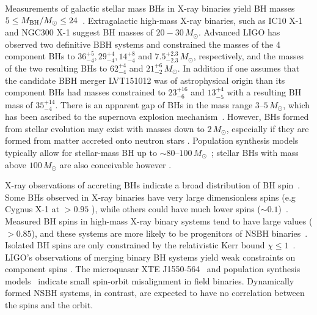 \documentclass[twocolumn]{aastex6}
\begin{document}
Measurements of galactic stellar mass
\acp{BH} in X-ray binaries yield \ac{BH} masses
$5 \le M_{\rm BH}/{M_{\odot}}\le 24$~\citep{Farr:2010tu,Ozel:2010su,Merloni:2008tj,Wiktorowicz:2013dua}.
Extragalactic high-mass X-ray binaries, such as IC10 X-1 and NGC300 X-1 suggest
BH masses of $20-30\,{M_{\odot}}$. Advanced \ac{LIGO} has observed two definitive \ac{BBH} systems and
constrained the masses of the 4 component \acp{BH} to $36_{-4}^{+5},
29_{-4}^{+4}, 14_{-4}^{+8}$ and $7.5_{-2.3}^{+2.3}\,M_{\odot}$, respectively, and
the masses of the two resulting \acp{BH} to $62_{-4}^{+4}$ and
$21_{-2}^{+6}\,M_{\odot}$. In addition if one assumes that the candidate \ac{BBH} merger LVT151012
was of astrophysical origin than its component \acp{BH} had masses constrained to $23_{-6}^{+16}$
and $13_{-5}^{+4}$ with a resulting \ac{BH} mass of $35_{-4}^{+14}$.
There is an apparent gap of \acp{BH} in the mass range $3$--$5\,
{M_{\odot}}$, which has been ascribed to the supernova explosion
mechanism~\citep{Belczynski:2011bn,Fryer:2011cx}. However, \acp{BH} formed from stellar
evolution may exist with masses down to $2\,{M_{\odot}}$, especially if they are formed
from matter accreted onto neutron stars \citep{O'Shaughnessy:2005qc}.
Population synthesis models typically allow for stellar-mass \ac{BH} up to
$\sim 80\text{--}100\,{M_{\odot}}$~\citep{Fryer:2011cx,Belczynski:2009xy,Dominik:2012kk};
stellar \acp{BH} with mass above $100\,{M_{\odot}}$ are also conceivable however
\citep{Belczynski:2014iua,deMink:2015yea}. 

X-ray observations of accreting \acp{BH} indicate a broad
distribution of \ac{BH} spin~\citep{Miller:2009cw,Shafee:2005ef,
McClintock:2006xd,Liu:2008tk,Gou:2009ks,Davis:2006cm, Li:2004aq,Miller:2014aaa}. 
Some \acp{BH} observed in X-ray binaries have very large dimensionless spins 
(e.g Cygnus X-1 at $>0.95$ \citep{2012MNRAS.424..217F,Gou:2011nq}), while others
could have much lower spins ($\sim 0.1$)~\citep{McClintock:2011zq}. Measured
\ac{BH} spins in high-mass X-ray binary systems tend to have large values ($>0.85$), and
these systems are more likely to be progenitors of \ac{NSBH}
binaries~\citep{McClintock:2013vwa}.  Isolated \ac{BH} spins are only constrained
by the relativistic Kerr bound ${\chi} \leq 1$~\cite{MTW}. 
LIGO's observations of merging binary \ac{BH} systems yield 
weak constraints on component spins \citep{TheLIGOScientific:2016wfe,Abbott:2016nmj,TheLIGOScientific:2016pea}.
The microquasar XTE J1550-564~\citep{Steiner:2011vr} and population synthesis
models~\citep{Fragos:2010tm} indicate small spin-orbit misalignment in
field binaries.
Dynamically formed \ac{NSBH} systems, in contrast, are expected to 
have no correlation between the spins and the orbit. 
\end{document}
